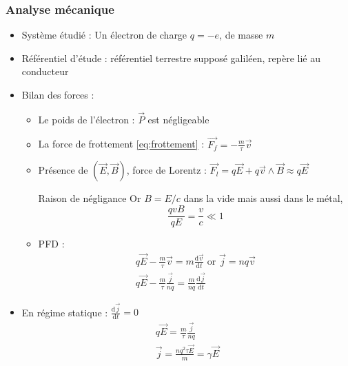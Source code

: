 \subsubsection{Analyse mécanique} %
\label{sec:Analyse mécanique}

\begin{itemize}

    \item Système étudié : Un électron de charge $q = -e$, de masse $m$ 
    \item Référentiel d'étude : référentiel terrestre supposé galiléen, repère lié au conducteur 
    \item Bilan des forces : 
      \begin{itemize}

          \item Le poids de l'électron : $\overrightarrow{P}$ est négligeable 
          \item La force de frottement \ref{eq:frottement} : $\overrightarrow{F_f} = - \frac{m}{\tau} \overrightarrow{v}$ 
          \item Présence de $(\overrightarrow{E}, \overrightarrow{B})$, force de Lorentz : $\overrightarrow{F_l} = q \overrightarrow{E}+ q \overrightarrow{v} \wedge \overrightarrow{B} \approx q \overrightarrow{E}$

            \begin{myproof}{Raison de négligance}{}
               Or $B = E/c$ dans la vide mais aussi dans le métal, 
               \begin{equation}
                 \frac{qvB}{qE}  = \frac{v}{c}  \ll 1
               \end{equation}
            \end{myproof}

          \item PFD : 
            \begin{gather}
              q \overrightarrow{E} - \frac{m}{\tau} \overrightarrow{v} = m \frac{\mathrm{d}\overrightarrow{v} }{\mathrm{d}t} \text{ or } \overrightarrow{j} = nq \overrightarrow{v} \\ 
              q \overrightarrow{E}- \frac{m}{\tau} \frac{\overrightarrow{j}}{nq} = \frac{m}{nq}  \frac{\mathrm{d} \overrightarrow{j}}{\mathrm{d}t} 
            \end{gather}

      \end{itemize}


          \item En régime statique :  $\frac{\mathrm{d} \overrightarrow{j}}{\mathrm{d} t} = 0$ 
            \begin{gather}
              q \overrightarrow{E} = \frac{m}{\tau} \frac{\overrightarrow{j}}{nq}  \\ 
              \overrightarrow{j} = \frac{n q ^{2}\tau \overrightarrow{E}}{m}  = \gamma \overrightarrow{E}
            \end{gather}


\end{itemize}
